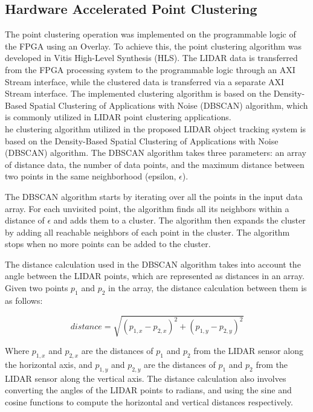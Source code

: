 \documentclass[journal]{IEEEtran} %
\begin{document}
\subsection{Hardware Accelerated Point Clustering}

The point clustering operation was implemented on the programmable logic of the FPGA using an Overlay. To achieve this, the point clustering algorithm was developed in Vitis High-Level Synthesis (HLS). The LIDAR data is transferred from the FPGA processing system to the programmable logic through an AXI Stream interface, while the clustered data is transferred via a separate AXI Stream interface. The implemented clustering algorithm is based on the Density-Based Spatial Clustering of Applications with Noise (DBSCAN) algorithm, which is commonly utilized in LIDAR point clustering applications.\\

he clustering algorithm utilized in the proposed LIDAR object tracking system is based on the Density-Based Spatial Clustering of Applications with Noise (DBSCAN) algorithm. The DBSCAN algorithm takes three parameters: an array of distance data, the number of data points, and the maximum distance between two points in the same neighborhood (epsilon, $\epsilon$).

The DBSCAN algorithm starts by iterating over all the points in the input data array. For each unvisited point, the algorithm finds all its neighbors within a distance of $\epsilon$ and adds them to a cluster. The algorithm then expands the cluster by adding all reachable neighbors of each point in the cluster. The algorithm stops when no more points can be added to the cluster.

The distance calculation used in the DBSCAN algorithm takes into account the angle between the LIDAR points, which are represented as distances in an array. Given two points $p_1$ and $p_2$ in the array, the distance calculation between them is as follows:

\begin{equation}
distance = \sqrt{(p_{1,x} - p_{2,x})^2 + (p_{1,y} - p_{2,y})^2}
\end{equation}

Where $p_{1,x}$ and $p_{2,x}$ are the distances of $p_1$ and $p_2$ from the LIDAR sensor along the horizontal axis, and $p_{1,y}$ and $p_{2,y}$ are the distances of $p_1$ and $p_2$ from the LIDAR sensor along the vertical axis. The distance calculation also involves converting the angles of the LIDAR points to radians, and using the sine and cosine functions to compute the horizontal and vertical distances respectively.
\end{document}
